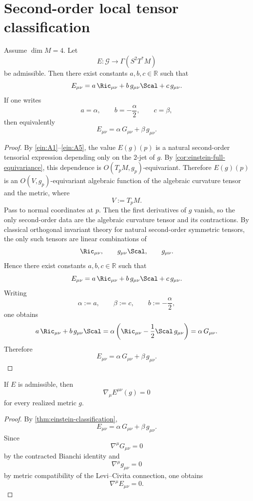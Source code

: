 \section{Second-order local tensor classification}
\label{sec:einstein-classification}
\begin{theorem}
	\label{thm:einstein-classification}
	Assume \(\dim M=4\).
	Let
	\[
		E:\mathcal G\to \Gamma(S^2T^*M)
	\]
	be admissible.
	Then there exist constants \(a,b,c\in\mathbb R\) such that
	\[
		E_{\mu\nu}
		=
		a\,\Ric_{\mu\nu}
		+
		b\,g_{\mu\nu}\Scal
		+
		c\,g_{\mu\nu}.
	\]
	If one writes
	\[
		a=\alpha,
		\qquad
		b=-\frac{\alpha}{2},
		\qquad
		c=\beta,
	\]
	then equivalently
	\[
		E_{\mu\nu}=\alpha\,G_{\mu\nu}+\beta\,g_{\mu\nu}.
	\]
\end{theorem}
\begin{proof}
	By \textup{\ref{ein:A1}}--\textup{\ref{ein:A5}}, the value \(E(g)(p)\)
	is a natural second-order tensorial expression depending only on the
	\(2\)-jet of \(g\).
	By \cref{cor:einstein-full-equivariance}, this dependence is
	\(O(T_pM,g_p)\)-equivariant.
	Therefore \(E(g)(p)\) is an \(O(V,g_p)\)-equivariant algebraic function
	of the algebraic curvature tensor and the metric, where
	\[
		V:=T_pM.
	\]
	Pass to normal coordinates at \(p\).
	Then the first derivatives of \(g\) vanish, so the only second-order
	data are the algebraic curvature tensor and its contractions.
	By classical orthogonal invariant theory for natural second-order
	symmetric tensors, the only such tensors are linear combinations of
	\[
		\Ric_{\mu\nu},
		\qquad
		g_{\mu\nu}\Scal,
		\qquad
		g_{\mu\nu}.
	\]
	Hence there exist constants \(a,b,c\in\mathbb R\) such that
	\[
		E_{\mu\nu}
		=
		a\,\Ric_{\mu\nu}
		+
		b\,g_{\mu\nu}\Scal
		+
		c\,g_{\mu\nu}.
	\]
	Writing
	\[
		\alpha:=a,
		\qquad
		\beta:=c,
		\qquad
		b:=-\frac{\alpha}{2},
	\]
	one obtains
	\[
		a\,\Ric_{\mu\nu}+b\,g_{\mu\nu}\Scal
		=
		\alpha\left(
		\Ric_{\mu\nu}-\frac12\Scal\,g_{\mu\nu}
		\right)
		=
		\alpha\,G_{\mu\nu}.
	\]
	Therefore
	\[
		E_{\mu\nu}=\alpha\,G_{\mu\nu}+\beta\,g_{\mu\nu}.
	\]
\end{proof}
\begin{corollary}
	If \(E\) is admissible, then
	\[
		\nabla_\mu E^{\mu\nu}(g)=0
	\]
	for every realized metric \(g\).
\end{corollary}
\begin{proof}
	By \cref{thm:einstein-classification},
	\[
		E_{\mu\nu}=\alpha\,G_{\mu\nu}+\beta\,g_{\mu\nu}.
	\]
	Since
	\[
		\nabla^\mu G_{\mu\nu}=0
	\]
	by the contracted Bianchi identity and
	\[
		\nabla^\mu g_{\mu\nu}=0
	\]
	by metric compatibility of the Levi--Civita connection, one obtains
	\[
		\nabla^\mu E_{\mu\nu}=0.
	\]
\end{proof}
